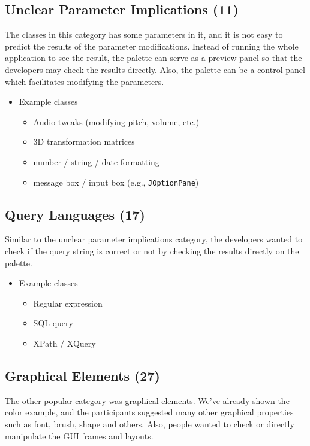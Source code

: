 \documentclass[conference]{IEEEtran}
\begin{document}
\subsection{Unclear Parameter Implications (11)}
The classes in this category has some parameters in it, and it is not easy to predict the results of the parameter modifications. Instead of running the whole application to see the result, the palette can serve as a preview panel so that the developers may check the results directly. Also, the palette can be a control panel which facilitates modifying the parameters.
\begin{itemize}
	\item Example classes
	
	\begin{itemize}
		\item Audio tweaks (modifying pitch, volume, etc.)
		\item 3D transformation matrices
		\item number / string / date formatting
		\item message box / input box (e.g., \texttt{JOptionPane})
	\end{itemize}
\end{itemize}

\subsection{Query Languages (17)}
Similar to the unclear parameter implications category, the developers wanted to check if the query string is correct or not by checking the results directly on the palette.

\begin{itemize}
	\item Example classes
	
	\begin{itemize}
		\item Regular expression
		\item SQL query
		\item XPath / XQuery
	\end{itemize}
\end{itemize}

\subsection{Graphical Elements (27)}
The other popular category was graphical elements. We've already shown the color example, and the participants suggested many other graphical properties such as font, brush, shape and others. Also, people wanted to check or directly manipulate the GUI frames and layouts.
\end{document}
